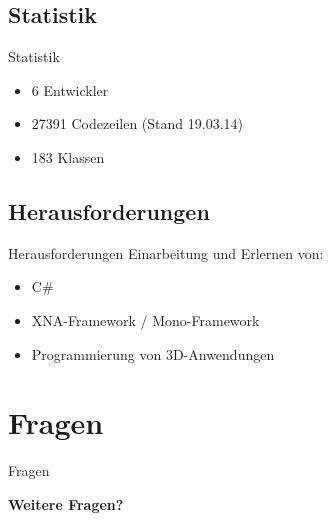 \documentclass[18pt]{beamer}
\begin{document}
\subsection{Statistik}
\begin{frame}{Statistik}
\begin{itemize}
\item 6 Entwickler
\item 27391 Codezeilen (Stand 19.03.14)
\item 183 Klassen
\end{itemize}
\end{frame}

\subsection{Herausforderungen}
\begin{frame} {Herausforderungen}
Einarbeitung und Erlernen von:
\begin{itemize}
\item C\#
\item XNA-Framework / Mono-Framework
\item Programmierung von 3D-Anwendungen
\end{itemize}
\end{frame}


\section{Fragen}
\begin{frame}{Fragen}
\begin{center}
\Huge \textbf{Weitere Fragen?}
\end{center}
\end{frame}



%
%
\end{document}
